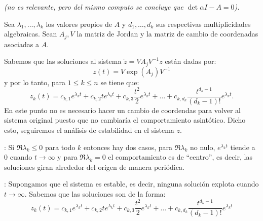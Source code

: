 \documentclass[10pt]{article}
\begin{document}
\begin{plist}
    \textit{(no es relevante, pero del mismo computo se concluye que \(\det \alpha I - A =
    0\)).}
    \item Sea \(\lambda_1, \dots, \lambda_k\) los valores propios de \(A\)
    y \(d_1, \dots, d_k\) sus respectivas multiplicidades algebraicas.
    Sean \(A_j, V\) la matriz de Jordan y la matriz de cambio de coordenadas
    asociadas a \(A\).

    Sabemos que las soluciones al sistema \(\dot{z} = VA_jV^{-1} z\) están dadas por:
    \[
        z(t) = V\exp\left(A_j\right) V^{-1}
    \]
    y por lo tanto, para \(1\le k \le n\) se tiene que:
    \[
        z_k(t)
        =
        c_{k,1} e^{\lambda_k t} +
        c_{k,2} t e^{\lambda_k t} +
        c_{k,3} \frac{t^2}{2} e^{\lambda_k t}
        +\dots+
        c_{k,d_k} \frac{t^{d_k - 1}}{(d_k - 1)!} e^{\lambda_k t}
    .\]
    En este punto no es necesario hacer un cambio de coordendas para volver al sistema
    original puesto que no cambiaría el comportamiento asintótico. Dicho esto,
    seguiremos el análisis de estabilidad en el sistema \(z\).

    \framebox{\(\impliedby\)}: Si \(\Re{\lambda_k} \le 0\)
    para todo \(k\) entonces hay dos casos, para \(\Re{\lambda_k}\) no nulo,
    \(e^{\lambda_k t}\) tiende a \(0\) cuando \(t\to
    \infty\) y para \(\Re{\lambda_k = 0}\) el comportamiento es de ``centro'',
    es decir, las soluciones giran alrededor del origen de manera periódica.

    \framebox{\(\implies\)}: Supongamos que el sistema es estable, es decir,
    ninguna solución explota cuando \(t\to \infty\). Sabemos que las soluciones
    son de la forma:
    \[
        z_k(t)
        =
        c_{k,1} e^{\lambda_k t} +
        c_{k,2} t e^{\lambda_k t} +
        c_{k,3} \frac{t^2}{2} e^{\lambda_k t}
        +\dots+
        c_{k,d_k} \frac{t^{d_k - 1}}{(d_k - 1)!} e^{\lambda_k t}
    \]

\end{plist}
\end{document}
